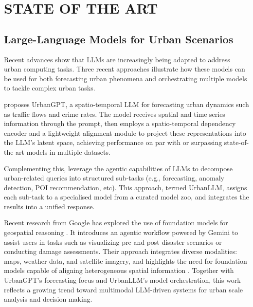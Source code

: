 \chapter{ STATE OF THE ART}


\section{Large-Language Models for Urban Scenarios}

Recent advances show that LLMs are increasingly being adapted to address urban computing tasks. Three recent approaches illustrate how these models can be used for both forecasting urban phenomena and orchestrating multiple models to tackle complex urban tasks.

\cite{Li2024UrbanGPT} proposes UrbanGPT, a spatio-temporal LLM for forecasting urban dynamics such as traffic flows and crime rates. The model receives spatial and time series information through the prompt, then employs a spatio-temporal dependency encoder and a lightweight alignment module to project these representations into the LLM's latent space, achieving performance on par with or surpassing state-of-the-art models in multiple datasets. 

Complementing this, \cite{Jiang2024UrbanLLM} leverage the agentic capabilities of LLMs to decompose urban-related queries into structured sub-tasks (e.g., forecasting, anomaly detection, POI recommendation, etc). This approach, termed UrbanLLM, assigns each sub-task to a specialised model from a curated model zoo, and integrates the results into a unified response.

Recent research from Google has explored the use of foundation models for geospatial reasoning \cite{2025GoogleGeospatialReasoning}. It introduces an agentic workflow powered by Gemini to assist users in tasks such as visualizing pre and post disaster scenarios or conducting damage assessments. Their approach integrates diverse modalities: maps, weather data, and satellite imagery, and highlights the need for foundation models capable of aligning heterogeneous spatial information . Together with UrbanGPT's forecasting focus and UrbanLLM's model orchestration, this work reflects a growing trend toward multimodal LLM-driven systems for urban scale analysis and decision making.

